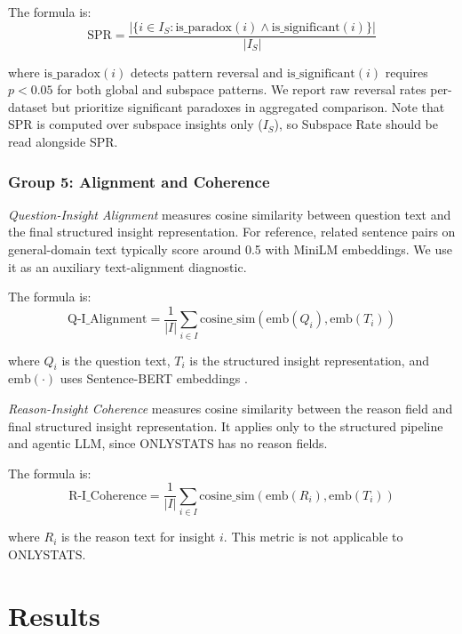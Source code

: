 \documentclass[conference]{IEEEtran}
\begin{document}
The formula is:
\begin{equation}
\text{SPR} = \frac{|\{i \in I_S : \text{is\_paradox}(i) \land \text{is\_significant}(i)\}|}{|I_S|}
\end{equation}

where $\text{is\_paradox}(i)$ detects pattern reversal and $\text{is\_significant}(i)$ requires $p < 0.05$ for both global and subspace patterns. We report raw reversal rates per-dataset but prioritize significant paradoxes in aggregated comparison. Note that SPR is computed over subspace insights only ($I_S$), so Subspace Rate should be read alongside SPR.

\subsubsection{Group 5: Alignment and Coherence}

\textit{Question-Insight Alignment} measures cosine similarity between question text and the final structured insight representation. For reference, related sentence pairs on general-domain text typically score around 0.5 with MiniLM embeddings. We use it as an auxiliary text-alignment diagnostic.

The formula is:
\begin{equation}
\text{Q-I\_Alignment} = \frac{1}{|I|} \sum_{i \in I} \text{cosine\_sim}(\text{emb}(Q_i), \text{emb}(T_i))
\end{equation}

where $Q_i$ is the question text, $T_i$ is the structured insight representation, and $\text{emb}(\cdot)$ uses Sentence-BERT embeddings \cite{sbert}.

\textit{Reason-Insight Coherence} measures cosine similarity between the reason field and final structured insight representation. It applies only to the structured pipeline and agentic LLM, since ONLYSTATS has no reason fields.

The formula is:
\begin{equation}
\text{R-I\_Coherence} = \frac{1}{|I|} \sum_{i \in I} \text{cosine\_sim}(\text{emb}(R_i), \text{emb}(T_i))
\end{equation}

where $R_i$ is the reason text for insight $i$. This metric is not applicable to ONLYSTATS.

\section{Results}
\label{sec:results}
\end{document}
